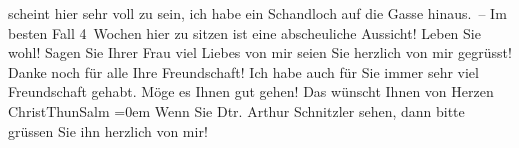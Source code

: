 \begin{ledgroupsized}[t]{13cm}
               scheint hier sehr voll zu sein, {\kaufmannsund} ich habe ein
               Schandloch auf die Gasse hinaus. –\pend
           \pstart
           Im besten Fall 4 Wochen hier zu sitzen ist eine abscheuliche Aussicht!\pend
           \pstart
           Leben Sie wohl! Sagen Sie Ihrer Frau viel Liebes von mir {\kaufmannsund} seien Sie herzlich
               von mir gegrüsst!\pend
           \pstart
           {\pb}Danke noch für alle Ihre
               Freundschaft! Ich habe auch für Sie immer sehr viel Freundschaft gehabt.\pend
           \pstart
           Möge es Ihnen gut gehen! Das wünscht Ihnen von Herzen{\\[\baselineskip]}\spacefill\mbox{ChristThunSalm}\pend
           \leftskip=0em{}\pstart
           \noindent{}Wenn Sie Dtr. Arthur Schnitzler sehen, dann bitte grüssen Sie ihn herzlich von
                  mir!\pend
           
         
         \endnumbering{}\end{ledgroupsized}  \newcommand{\dateiname}{L01678}\newcommand{\titel}{Hugo von Hofmannsthal an Arthur Schnitzler mit Beilage Christiane Thun an Hofmannsthal, [25. 5. 1907]}\newcommand{\editorInnen}{Martin Anton Müller und Gerd-Hermann Susen}
      